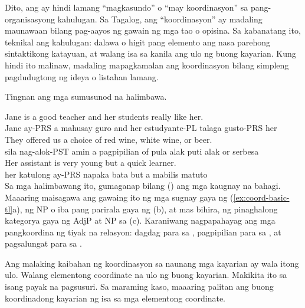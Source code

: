 Dito, ang  ay hindi lamang \enquote{magkasundo} o \enquote{may koordinasyon} sa pang-organisasyong kahulugan. Sa Tagalog, ang \enquote{koordinasyon} ay madaling maunawaan bilang pag-aayos ng gawain ng mga tao o opisina. Sa kabanatang ito, teknikal ang kahulugan: dalawa o higit pang elemento ang nasa parehong sintaktikong katayuan, at walang isa sa kanila ang ulo ng buong kayarian. Kung hindi ito malinaw, madaling mapagkamalan ang koordinasyon bilang simpleng pagdudugtong ng ideya o listahan lamang.

Tingnan ang mga sumusunod na halimbawa.

\ea \label{ex:coord-basic-tl}
    \ea \gll {\ob}Jane is a good teacher{\cb} {\ob}and her students really like her{\cb}.\\
        Jane ay-PRS a mahusay guro and her estudyante-PL talaga gusto-PRS her\\
    \glt {}
    \ex \gll They offered us a choice of {\ob}red wine{\cb}, {\ob}white wine{\cb}, {\ob}or beer{\cb}.\\
        sila nag-alok-PST amin a pagpipilian of pula alak puti alak or serbesa\\
    \glt {}
    \ex \gll Her assistant is {\ob}very young{\cb} {\ob}but a quick learner{\cb}.\\
        her katulong ay-PRS napaka bata but a mabilis matuto\\
    \glt {}
    \z
\z
Sa mga halimbawang ito, gumaganap bilang  () ang mga kaugnay na bahagi. Maaaring maisagawa ang gawaing ito ng mga sugnay gaya ng (\ref{ex:coord-basic-tl}a), ng NP o iba pang parirala gaya ng (b), at mas bihira, ng pinaghalong kategorya gaya ng AdjP at NP sa (c). Karaniwang nagpapahayag ang mga pangkoordina ng tiyak na relasyon: dagdag para sa , pagpipilian para sa , at pagsalungat para sa .

Ang malaking kaibahan ng koordinasyon sa naunang mga kayarian ay wala itong ulo. Walang elementong coordinate na ulo ng buong kayarian. Makikita ito sa isang payak na pagsusuri. Sa maraming kaso, maaaring palitan ang buong koordinadong kayarian ng isa sa mga elementong coordinate.

